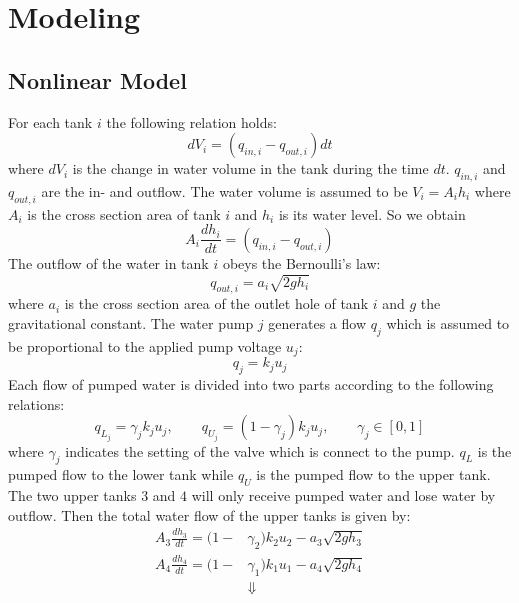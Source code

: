 \documentclass[a4paper,12pt,oneside,onecolumn]{article}
\begin{document}
\section{Modeling}
\subsection{Nonlinear Model}
For each tank $i$ the following relation holds:
\begin{equation}
    dV_i = (q_{in,i} - q_{out,i})dt
\end{equation}
where $dV_i$ is the change in water volume in the tank during the time $dt$. $q_{in,i}$ and $q_{out,i}$ are the in- and outflow. The water volume is assumed to be $V_i=A_i h_i$ where $A_i$ is the cross section area of tank $i$ and $h_i$ is its water level. So we obtain
\begin{equation}
    A_i \frac{dh_i}{dt} = (q_{in,i} - q_{out,i})
\end{equation}
The outflow of the water in tank $i$ obeys the Bernoulli's law:
\begin{equation}
    q_{out,i} = a_i \sqrt{2gh_i}
\end{equation}
where $a_i$ is the cross section area of the outlet hole of tank $i$ and $g$ the gravitational constant. 
The water pump $j$ generates a flow $q_j$ which is assumed to be proportional to the applied pump voltage $u_j$:
\begin{equation}
    q_j = k_j u_j
\end{equation}
Each flow of pumped water is divided into two parts according to the following relations:
\begin{equation}
    q_L_j = \gamma_j k_j u_j, \qquad q_U_j = (1-\gamma_j) k_j u_j, \qquad \gamma_j \in [0, 1]
\end{equation}
where $\gamma_j$ indicates the setting of the valve which is connect to the pump. $q_L$ is the pumped flow to the lower tank while $q_U$ is the pumped flow to the upper tank. \\
The two upper tanks $3$ and $4$ will only receive pumped water and lose water by outflow. Then the total water flow of the upper tanks is given by: 
\begin{equation}
\begin{aligned}
A_3\frac{dh_3}{dt} = (1- & \gamma_2) k_2 u_2 - a_3 \sqrt{2 g h_3} \\
A_4\frac{dh_4}{dt} = (1- & \gamma_1) k_1 u_1 - a_4 \sqrt{2 g h_4} \\
& \Downarrow
\end{aligned}
\end{equation}
\end{document}
